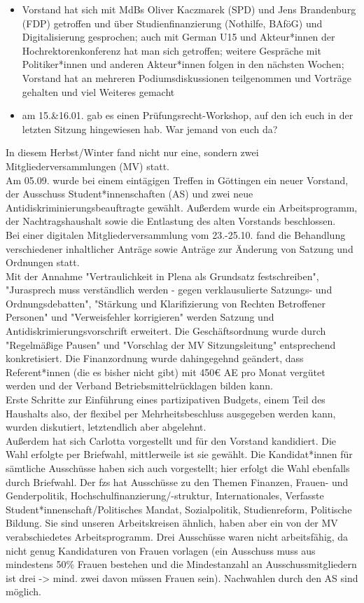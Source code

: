 \begin{itemize}
    \item{Vorstand hat sich mit MdBs Oliver Kaczmarek (SPD) und Jens Brandenburg (FDP) getroffen und über Studienfinanzierung (Nothilfe, BAföG) und Digitalisierung gesprochen; auch mit German U15 und Akteur*innen der Hochrektorenkonferenz hat man sich getroffen; weitere Gespräche mit Politiker*innen und anderen Akteur*innen folgen in den nächsten Wochen; Vorstand hat an mehreren Podiumsdiskussionen teilgenommen und Vorträge gehalten und viel Weiteres gemacht}
    \item{am 15.\&16.01. gab es einen Prüfungsrecht-Workshop, auf den ich euch in der letzten Sitzung hingewiesen hab. War jemand von euch da?}
\end{itemize}
In diesem Herbst/Winter fand nicht nur eine, sondern zwei Mitgliederversammlungen (MV) statt.\\
Am 05.09. wurde bei einem eintägigen Treffen in Göttingen ein neuer Vorstand, der Ausschuss Student*innenschaften (AS) und zwei neue Antidiskriminierungsbeauftragte gewählt. Außerdem wurde ein Arbeitsprogramm, der Nachtragshaushalt sowie die Entlastung des alten Vorstands beschlossen.\\
Bei einer digitalen Mitgliederversammlung vom 23.-25.10. fand die Behandlung verschiedener inhaltlicher Anträge sowie Anträge zur Änderung von Satzung und Ordnungen statt.\\
Mit der Annahme "Vertraulichkeit in Plena als Grundsatz festschreiben", "Jurasprech muss verständlich werden - gegen verklausulierte Satzungs- und Ordnungsdebatten", "Stärkung und Klarifizierung von Rechten Betroffener Personen" und "Verweisfehler korrigieren" werden Satzung und Antidiskrimierungsvorschrift erweitert. Die Geschäftsordnung wurde durch "Regelmäßige Pausen" und "Vorschlag der MV Sitzungsleitung" entsprechend konkretisiert. Die Finanzordnung wurde dahingegehnd geändert, dass Referent*innen (die es bisher nicht gibt) mit 450€ AE pro Monat vergütet werden und der Verband Betriebsmittelrücklagen bilden kann.\\
Erste Schritte zur Einführung eines partizipativen Budgets, einem Teil des Haushalts also, der flexibel per Mehrheitsbeschluss ausgegeben werden kann, wurden diskutiert, letztendlich aber abgelehnt.\\
Außerdem hat sich Carlotta vorgestellt und für den Vorstand kandidiert. Die Wahl erfolgte per Briefwahl, mittlerweile ist sie gewählt. Die Kandidat*innen für sämtliche Ausschüsse haben sich auch vorgestellt; hier erfolgt die Wahl ebenfalls durch Briefwahl. Der fzs hat Ausschüsse zu den Themen Finanzen, Frauen- und Genderpolitik, Hochschulfinanzierung/-struktur, Internationales, Verfasste Student*innenschaft/Politisches Mandat, Sozialpolitik, Studienreform, Politische Bildung. Sie sind unseren Arbeitskreisen ähnlich, haben aber ein von der MV verabschiedetes Arbeitsprogramm. Drei Ausschüsse waren nicht arbeitsfähig, da nicht genug Kandidaturen von Frauen vorlagen (ein Ausschuss muss aus mindestens 50\% Frauen bestehen und die Mindestanzahl an Ausschussmitgliedern ist drei -> mind. zwei davon müssen Frauen sein). Nachwahlen durch den AS sind möglich.\\
